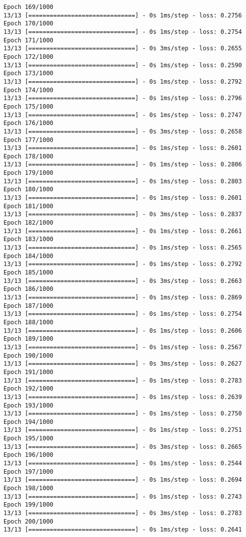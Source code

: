 \documentclass[11pt]{article}
\begin{document}
\begin{Verbatim}[commandchars=\\\{\}]
Epoch 169/1000
13/13 [==============================] - 0s 1ms/step - loss: 0.2756
Epoch 170/1000
13/13 [==============================] - 0s 1ms/step - loss: 0.2754
Epoch 171/1000
13/13 [==============================] - 0s 3ms/step - loss: 0.2655
Epoch 172/1000
13/13 [==============================] - 0s 1ms/step - loss: 0.2590
Epoch 173/1000
13/13 [==============================] - 0s 1ms/step - loss: 0.2792
Epoch 174/1000
13/13 [==============================] - 0s 1ms/step - loss: 0.2796
Epoch 175/1000
13/13 [==============================] - 0s 1ms/step - loss: 0.2747
Epoch 176/1000
13/13 [==============================] - 0s 3ms/step - loss: 0.2658
Epoch 177/1000
13/13 [==============================] - 0s 1ms/step - loss: 0.2601
Epoch 178/1000
13/13 [==============================] - 0s 1ms/step - loss: 0.2806
Epoch 179/1000
13/13 [==============================] - 0s 1ms/step - loss: 0.2803
Epoch 180/1000
13/13 [==============================] - 0s 1ms/step - loss: 0.2601
Epoch 181/1000
13/13 [==============================] - 0s 3ms/step - loss: 0.2837
Epoch 182/1000
13/13 [==============================] - 0s 1ms/step - loss: 0.2661
Epoch 183/1000
13/13 [==============================] - 0s 1ms/step - loss: 0.2565
Epoch 184/1000
13/13 [==============================] - 0s 1ms/step - loss: 0.2792
Epoch 185/1000
13/13 [==============================] - 0s 3ms/step - loss: 0.2663
Epoch 186/1000
13/13 [==============================] - 0s 1ms/step - loss: 0.2869
Epoch 187/1000
13/13 [==============================] - 0s 1ms/step - loss: 0.2754
Epoch 188/1000
13/13 [==============================] - 0s 1ms/step - loss: 0.2606
Epoch 189/1000
13/13 [==============================] - 0s 1ms/step - loss: 0.2567
Epoch 190/1000
13/13 [==============================] - 0s 3ms/step - loss: 0.2627
Epoch 191/1000
13/13 [==============================] - 0s 1ms/step - loss: 0.2783
Epoch 192/1000
13/13 [==============================] - 0s 1ms/step - loss: 0.2639
Epoch 193/1000
13/13 [==============================] - 0s 1ms/step - loss: 0.2750
Epoch 194/1000
13/13 [==============================] - 0s 1ms/step - loss: 0.2751
Epoch 195/1000
13/13 [==============================] - 0s 3ms/step - loss: 0.2665
Epoch 196/1000
13/13 [==============================] - 0s 1ms/step - loss: 0.2544
Epoch 197/1000
13/13 [==============================] - 0s 1ms/step - loss: 0.2694
Epoch 198/1000
13/13 [==============================] - 0s 1ms/step - loss: 0.2743
Epoch 199/1000
13/13 [==============================] - 0s 3ms/step - loss: 0.2783
Epoch 200/1000
13/13 [==============================] - 0s 1ms/step - loss: 0.2641

\end{Verbatim}
\end{document}
